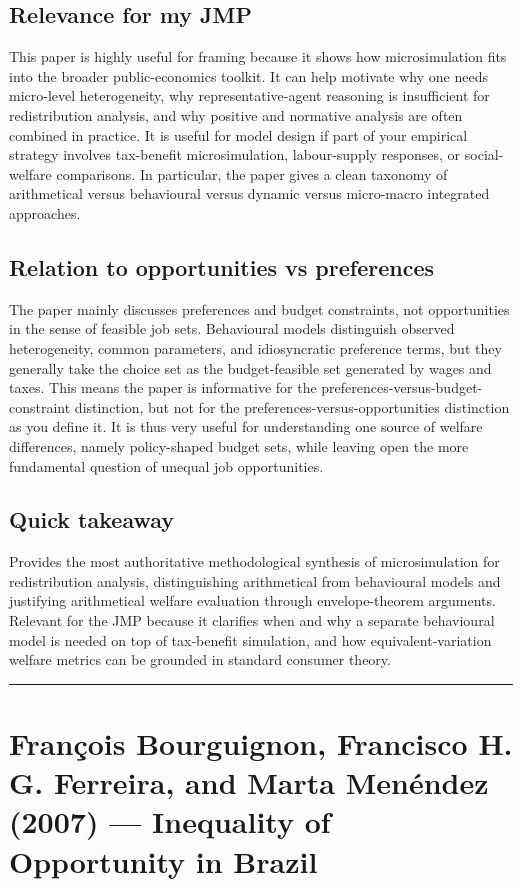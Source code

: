 \documentclass[11pt,a4paper]{article}
\begin{document}
\subsection*{Relevance for my JMP}
This paper is highly useful for framing because it shows how microsimulation fits into the broader public-economics toolkit. It can help motivate why one needs micro-level heterogeneity, why representative-agent reasoning is insufficient for redistribution analysis, and why positive and normative analysis are often combined in practice. It is useful for model design if part of your empirical strategy involves tax-benefit microsimulation, labour-supply responses, or social-welfare comparisons. In particular, the paper gives a clean taxonomy of arithmetical versus behavioural versus dynamic versus micro-macro integrated approaches.

\subsection*{Relation to opportunities vs preferences}
The paper mainly discusses preferences and budget constraints, not opportunities in the sense of feasible job sets. Behavioural models distinguish observed heterogeneity, common parameters, and idiosyncratic preference terms, but they generally take the choice set as the budget-feasible set generated by wages and taxes. This means the paper is informative for the preferences-versus-budget-constraint distinction, but not for the preferences-versus-opportunities distinction as you define it. It is thus very useful for understanding one source of welfare differences, namely policy-shaped budget sets, while leaving open the more fundamental question of unequal job opportunities.

\subsection*{Quick takeaway}
Provides the most authoritative methodological synthesis of microsimulation for redistribution analysis, distinguishing arithmetical from behavioural models and justifying arithmetical welfare evaluation through envelope-theorem arguments. Relevant for the JMP because it clarifies when and why a separate behavioural model is needed on top of tax-benefit simulation, and how equivalent-variation welfare metrics can be grounded in standard consumer theory.


\medskip\hrule\medskip

\section*{François Bourguignon, Francisco H. G. Ferreira, and Marta Menéndez (2007) — Inequality of Opportunity in Brazil}
\end{document}
